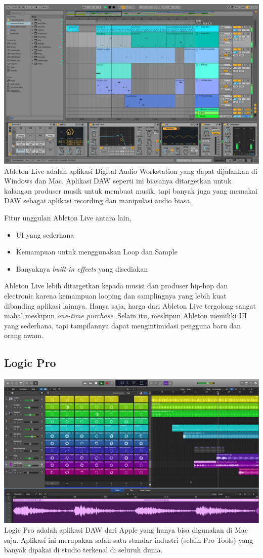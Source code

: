 \documentclass[12pt,a4paper]{report}
\begin{document}
  \includegraphics[width=\textwidth]{images/ableton.jpg}
  Ableton Live adalah aplikasi Digital Audio Workstation yang dapat dijalankan di Windows dan Mac.
  Aplikasi DAW seperti ini biasanya ditargetkan untuk kalangan produser
  musik untuk membuat musik, tapi banyak juga yang memakai DAW sebagai
  aplikasi recording dan manipulasi audio biasa.

  Fitur unggulan Ableton Live antara lain,

  \begin{itemize}
  \item
    UI yang sederhana
  \item
    Kemampuan untuk menggunakan Loop dan Sample
  \item
    Banyaknya \emph{built-in effects} yang disediakan
  \end{itemize}

  Ableton Live lebih ditargetkan kepada musisi dan produser hip-hop dan
  electronic karena kemampuan looping dan samplingnya yang lebih kuat
  dibanding aplikasi lainnya. Hanya saja, harga dari Ableton Live
  tergolong sangat mahal meskipun \emph{one-time purchase}. Selain itu,
  meskipun Ableton memiliki UI yang sederhana, tapi tampilannya dapat
  mengintimidasi pengguna baru dan orang awam.

  \subsection*{Logic Pro}\label{logic-pro}

  \includegraphics[width=\textwidth]{images/logic.jpg}
  Logic Pro adalah aplikasi DAW dari Apple yang hanya bisa digunakan di Mac saja. Aplikasi ini merupakan
  salah satu standar industri (selain Pro Tools) yang banyak dipakai di
  studio terkenal di seluruh dunia.
\end{document}
